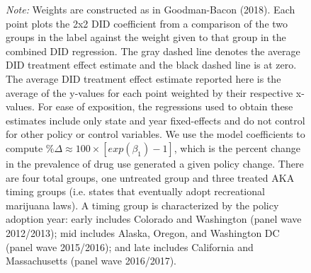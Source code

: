 \documentclass[12pt]{article}%
\begin{document}
\begin{figure}
\begin{minipage}{.9\linewidth}
\begin{subfigure}[b]{0.32\columnwidth}
    \label{fig:bacon_lead_lag_coke_365}
  \end{subfigure}
  \label{fig:bacon_lead_lag_oth}
 \begin{justify}
                {\footnotesize \vspace{-.5cm}
                    \emph{Note:} 
    Weights are constructed as in Goodman-Bacon (2018).
    Each point plots the 2x2 DID coefficient from a comparison of the two groups in the label against the weight given to that group in the combined DID regression.
    The gray dashed line denotes the average DID treatment effect estimate and the black dashed line is at zero.
    The average DID treatment effect estimate reported here is the average of the y-values for each point weighted by their respective x-values.
    For ease of exposition, the regressions used to obtain these estimates include only state and year fixed-effects and do not control for other policy or control variables.
    We use the model coefficients to compute $\% \Delta \approx 100\times \left[exp(\beta_1)-1\right]$, which is the percent change in the prevalence of drug use generated a given policy change.     
    There are four total groups, one untreated group and three treated AKA timing groups (i.e. states that eventually adopt recreational marijuana laws).
    A timing group is characterized by the policy adoption year:
    early includes Colorado and Washington (panel wave 2012/2013);
    mid includes Alaska, Oregon, and Washington DC (panel wave 2015/2016);
    and late includes California and Massachusetts (panel wave 2016/2017).
\par}
            \end{justify}
  \end{minipage}
\end{figure}
\end{document}
